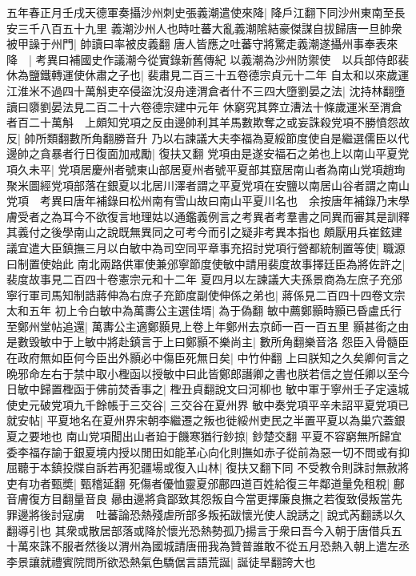 五年春正月壬戌天德軍奏攝沙州刺史張義潮遣使來降|{
	降戶江翻下同沙州東南至長安三千八百五十九里}
義潮沙州人也時吐蕃大亂義潮隂結豪傑謀自拔歸唐一旦帥衆被甲譟于州門|{
	帥讀曰率被皮義翻}
唐人皆應之吐蕃守將驚走義潮遂攝州事奉表來降　|{
	考異曰補國史作議潮今從實錄新舊傳紀}
以義潮為沙州防禦使　以兵部侍郎裴休為鹽鐵轉運使休肅之子也|{
	裴肅見二百三十五卷德宗貞元十二年}
自太和以來歲運江淮米不過四十萬斛吏卒侵盜沈沒舟達渭倉者什不三四大墮劉晏之法|{
	沈持林翻墮讀曰隳劉晏法見二百二十六卷德宗建中元年}
休窮究其弊立漕法十條歲運米至渭倉者百二十萬斛　上頗知党項之反由邊帥利其羊馬數欺奪之或妄誅殺党項不勝憤怨故反|{
	帥所類翻數所角翻勝音升}
乃以右諫議大夫李福為夏綏節度使自是繼選儒臣以代邊帥之貪暴者行日復面加戒勵|{
	復扶又翻}
党項由是遂安福石之弟也上以南山平夏党項久未平|{
	党項居慶州者號東山部居夏州者號平夏部其竄居南山者為南山党項趙珣聚米圖經党項部落在銀夏以北居川澤者謂之平夏党項在安鹽以南居山谷者謂之南山党項　考異曰唐年補錄曰松州南有雪山故曰南山平夏川名也　余按唐年補錄乃末學膚受者之為耳今不欲復言地理姑以通鑑義例言之考異者考羣書之同異而審其是訓釋其義付之後學南山之說既無異同之可考今而引之疑非考異本指也}
頗厭用兵崔鉉建議宜遣大臣鎮撫三月以白敏中為司空同平章事充招討党項行營都統制置等使|{
	職源曰制置使始此}
南北兩路供軍使兼邠寧節度使敏中請用裴度故事擇廷臣為將佐許之|{
	裴度故事見二百四十卷憲宗元和十二年}
夏四月以左諫議大夫孫景商為左庶子充邠寧行軍司馬知制誥蔣伸為右庶子充節度副使伸係之弟也|{
	蔣係見二百四十四卷文宗太和五年}
初上令白敏中為萬夀公主選佳壻|{
	為于偽翻}
敏中薦鄭顥時顥已昏盧氏行至鄭州堂帖追還|{
	萬夀公主適鄭顥見上卷上年鄭州去京師一百一百五里}
顥甚銜之由是數毁敏中于上敏中將赴鎮言于上曰鄭顥不樂尚主|{
	數所角翻樂音洛}
怨臣入骨髓臣在政府無如臣何今臣出外顥必中傷臣死無日矣|{
	中竹仲翻}
上曰朕知之久矣卿何言之晩邪命左右于禁中取小檉函以授敏中曰此皆鄭郎譖卿之書也朕若信之豈任卿以至今日敏中歸置檉函于佛前焚香事之|{
	檉丑貞翻說文曰河柳也}
敏中軍于寧州壬子定遠城使史元破党項九千餘帳于三交谷|{
	三交谷在夏州界}
敏中奏党項平辛未詔平夏党項已就安帖|{
	平夏地名在夏州界宋朝李繼遷之叛也徙綏州吏民之半置平夏以為巢穴蓋銀夏之要地也}
南山党項聞出山者廹于饑寒猶行鈔掠|{
	鈔楚交翻}
平夏不容窮無所歸宜委李福存諭于銀夏境内授以閒田如能革心向化則撫如赤子從前為惡一切不問或有抑屈聽于本鎮投牒自訴若再犯疆場或復入山林|{
	復扶又翻下同}
不受教令則誅討無赦將吏有功者甄奬|{
	甄稽延翻}
死傷者優恤靈夏邠鄜四道百姓給復三年鄰道量免租稅|{
	鄜音膚復方目翻量音良}
曏由邊將貪鄙致其怨叛自今當更擇廉良撫之若復致侵叛當先罪邊將後討寇虜　吐蕃論恐熱殘虐所部多叛拓跋懷光使人說誘之|{
	說式芮翻誘以久翻導引也}
其衆或散居部落或降於懷光恐熱勢孤乃揚言于衆曰吾今入朝于唐借兵五十萬來誅不服者然後以渭州為國城請唐冊我為贊普誰敢不從五月恐熱入朝上遣左丞李景讓就禮賓院問所欲恐熱氣色驕倨言語荒誕|{
	誕徒旱翻誇大也}
